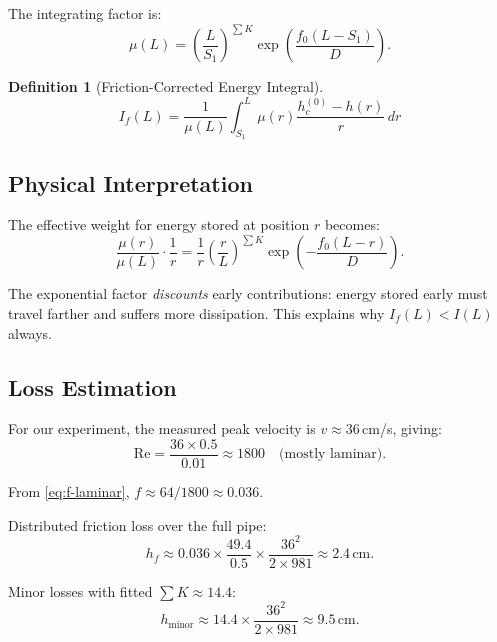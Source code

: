 \documentclass[11pt,a4paper]{article}
\theoremstyle{definition}
\newtheorem{definition}{Definition}
\begin{document}
The integrating factor is:
\begin{equation}
  \mu(L) = \left(\frac{L}{S_1}\right)^{\sum K}\exp\left(\frac{f_0(L - S_1)}{D}\right).
  \label{eq:integrating-factor}
\end{equation}

\begin{definition}[Friction-Corrected Energy Integral]
\begin{equation}
  \boxed{I_f(L) = \frac{1}{\mu(L)}\int_{S_1}^{L}\mu(r)\frac{h_c^{(0)} - h(r)}{r}\,dr}
  \label{eq:I-f}
\end{equation}
\end{definition}

\subsection{Physical Interpretation}

The effective weight for energy stored at position $r$ becomes:
\begin{equation}
  \frac{\mu(r)}{\mu(L)} \cdot \frac{1}{r} = \frac{1}{r}\left(\frac{r}{L}\right)^{\sum K}\exp\left(-\frac{f_0(L-r)}{D}\right).
  \label{eq:effective-weight}
\end{equation}

The exponential factor \emph{discounts} early contributions: energy stored early must travel farther and suffers more dissipation. This explains why $I_f(L) < I(L)$ always.

\subsection{Loss Estimation}

For our experiment, the measured peak velocity is $v \approx 36$\,cm/s, giving:
\begin{equation}
  \text{Re} = \frac{36 \times 0.5}{0.01} \approx 1800 \quad \text{(mostly laminar)}.
  \label{eq:Re-estimate}
\end{equation}

From \eqref{eq:f-laminar}, $f \approx 64/1800 \approx 0.036$.

Distributed friction loss over the full pipe:
\begin{equation}
  h_f \approx 0.036 \times \frac{49.4}{0.5} \times \frac{36^2}{2 \times 981} \approx 2.4\,\text{cm}.
  \label{eq:hf-estimate}
\end{equation}

Minor losses with fitted $\sum K \approx 14.4$:
\begin{equation}
  h_{\text{minor}} \approx 14.4 \times \frac{36^2}{2 \times 981} \approx 9.5\,\text{cm}.
  \label{eq:hminor-estimate}
\end{equation}
\end{document}
